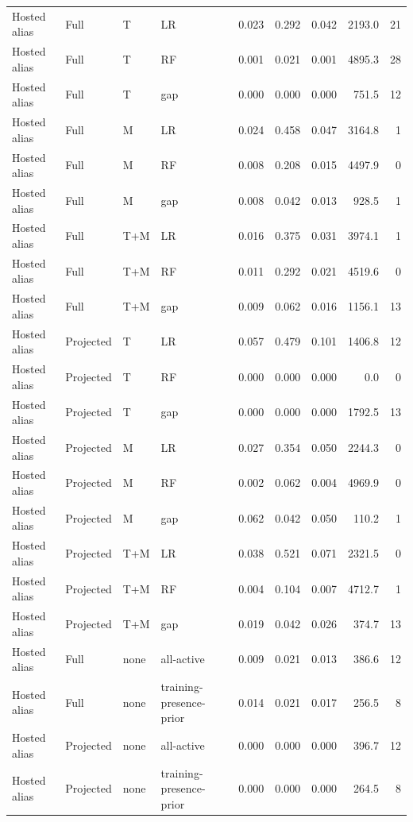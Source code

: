 \begin{longtable}{@{}P{.14\textwidth}P{.13\textwidth}P{.05\textwidth}P{.21\textwidth}rrrrr@{}}
\pagebreak
Hosted alias & Full & T & LR & 0.023 & 0.292 & 0.042 & 2193.0 & 21 \\
Hosted alias & Full & T & RF & 0.001 & 0.021 & 0.001 & 4895.3 & 28 \\
Hosted alias & Full & T & gap & 0.000 & 0.000 & 0.000 & 751.5 & 12 \\
Hosted alias & Full & M & LR & 0.024 & 0.458 & 0.047 & 3164.8 & 1 \\
Hosted alias & Full & M & RF & 0.008 & 0.208 & 0.015 & 4497.9 & 0 \\
Hosted alias & Full & M & gap & 0.008 & 0.042 & 0.013 & 928.5 & 1 \\
Hosted alias & Full & T+M & LR & 0.016 & 0.375 & 0.031 & 3974.1 & 1 \\
Hosted alias & Full & T+M & RF & 0.011 & 0.292 & 0.021 & 4519.6 & 0 \\
Hosted alias & Full & T+M & gap & 0.009 & 0.062 & 0.016 & 1156.1 & 13 \\
Hosted alias & Projected & T & LR & 0.057 & 0.479 & 0.101 & 1406.8 & 12 \\
Hosted alias & Projected & T & RF & 0.000 & 0.000 & 0.000 & 0.0 & 0 \\
Hosted alias & Projected & T & gap & 0.000 & 0.000 & 0.000 & 1792.5 & 13 \\
Hosted alias & Projected & M & LR & 0.027 & 0.354 & 0.050 & 2244.3 & 0 \\
Hosted alias & Projected & M & RF & 0.002 & 0.062 & 0.004 & 4969.9 & 0 \\
Hosted alias & Projected & M & gap & 0.062 & 0.042 & 0.050 & 110.2 & 1 \\
Hosted alias & Projected & T+M & LR & 0.038 & 0.521 & 0.071 & 2321.5 & 0 \\
Hosted alias & Projected & T+M & RF & 0.004 & 0.104 & 0.007 & 4712.7 & 1 \\
Hosted alias & Projected & T+M & gap & 0.019 & 0.042 & 0.026 & 374.7 & 13 \\
Hosted alias & Full & none & all-active & 0.009 & 0.021 & 0.013 & 386.6 & 12 \\
Hosted alias & Full & none & training-presence-prior & 0.014 & 0.021 & 0.017 & 256.5 & 8 \\
Hosted alias & Projected & none & all-active & 0.000 & 0.000 & 0.000 & 396.7 & 12 \\
Hosted alias & Projected & none & training-presence-prior & 0.000 & 0.000 & 0.000 & 264.5 & 8 \\
\end{longtable}
\normalsize\clearpage\twocolumn
